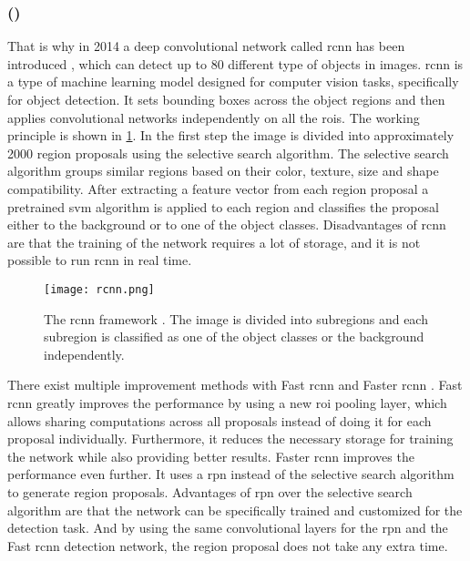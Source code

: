 \subsubsection{ ()}
\label{sssec:rcnn}
That is why in 2014 a deep convolutional network called \gls{rcnn} has been introduced \cite{Girshick2014}, which can detect up to 80 different type of objects in images.
\gls{rcnn} is a type of machine learning model designed for computer vision tasks, specifically for object detection.
It sets bounding boxes across the object regions and then applies convolutional networks independently on all the \glspl{roi}.
The working principle is shown in \cref{fig:rcnn}.
In the first step the image is divided into approximately 2000 region proposals using the selective search algorithm.
The selective search algorithm groups similar regions based on their color, texture, size and shape compatibility.
After extracting a feature vector from each region proposal a pretrained \gls{svm} algorithm is applied to each region and classifies the proposal either to the background or to one of the object classes.
Disadvantages of \gls{rcnn} are that the training of the network requires a lot of storage, and it is not possible to run \gls{rcnn} in real time.
\begin{figure}[htbp]
	\centering
	\texttt{[image: rcnn.png]}
	\caption[\acrshort{rcnn} framework]{The \acrshort{rcnn} framework \cite{Girshick2014}. The image is divided into subregions and each subregion is classified as one of the object classes or the background independently.}
	\label{fig:rcnn}
\end{figure}
There exist multiple improvement methods with Fast \gls{rcnn} \cite{Girshick2015} and Faster \gls{rcnn} \cite{Ren2017}.
Fast \gls{rcnn} greatly improves the performance by using a new \gls{roi} pooling layer, which allows sharing computations across all proposals instead of doing it for each proposal individually.
Furthermore, it reduces the necessary storage for training the network while also providing better results.
Faster \gls{rcnn} improves the performance even further.
It uses a \gls{rpn} instead of the selective search algorithm to generate region proposals.
Advantages of \gls{rpn} over the selective search algorithm are that the network can be specifically trained and customized for the detection task.
And by using the same convolutional layers for the \gls{rpn} and the Fast \gls{rcnn} detection network, the region proposal does not take any extra time.\\
